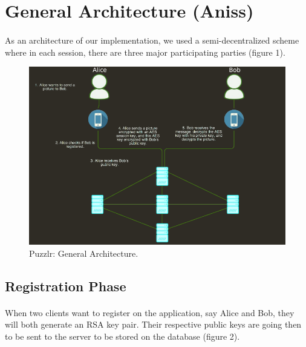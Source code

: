 \section{General Architecture (Aniss)}
    \paragraph{}
      As an architecture of our implementation, we used a semi-decentralized scheme where in each session, there are three major participating parties (figure 1).
 
      \begin{figure}[H]
      
	\centering
	\includegraphics[width=16cm]{images/architecture/architecture}
	\caption{Puzzlr: General Architecture.}
	\label{Figure 1}
      \end{figure}
      
      \subsection{Registration Phase}
      
	
	
	  
	\paragraph{}
	  When two clients want to register on the application, say Alice and Bob, they will both generate an RSA key pair. Their respective public keys are going then to be sent to the server to be stored on the database (figure 2).
	  

